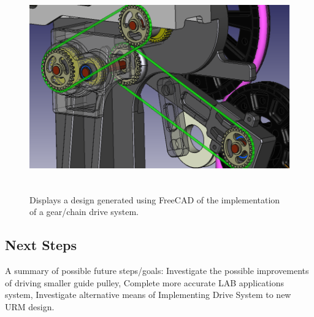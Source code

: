\documentclass[paper=a4, fontsize=11pt]{scrartcl}
\numberwithin{equation}{section}		%
\numberwithin{figure}{section}			%
\numberwithin{table}{section}				%
\begin{document}
        \begin{figure}[H]
                \includegraphics[height=9cm]{URM2}
                \caption{Displays a design generated using FreeCAD of the implementation of a gear/chain drive system.}
                \label{cadc2}
        \end{figure}
        
\subsection{Next Steps}
A summary of possible future steps/goals: Investigate the possible improvements of driving smaller guide pulley, Complete more accurate LAB applications system, Investigate alternative means of Implementing Drive System to new URM design.



\newpage

\appendix
\end{document}
